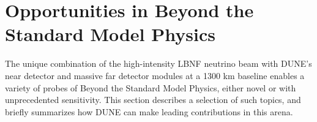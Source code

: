 \section{Opportunities in Beyond the Standard Model Physics}
\label{sec:exec-summ-physics-bsm}
The unique combination of the high-intensity LBNF neutrino beam with DUNE's near detector and massive \lartpc far detector modules at a 1300 km baseline enables a variety of probes of Beyond the Standard Model Physics, either novel or with unprecedented sensitivity. This section describes a selection of such topics, and briefly summarizes how DUNE can make leading contributions in this arena.

